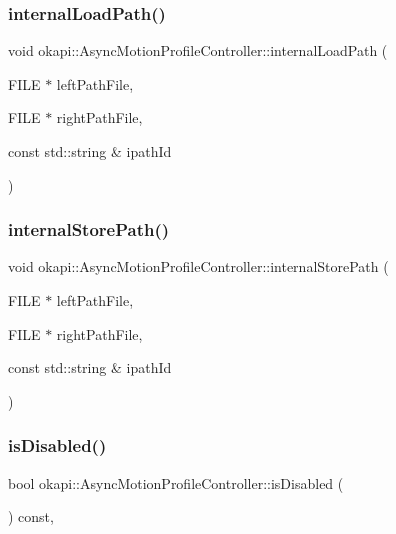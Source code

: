 \subsubsection{\texorpdfstring{internalLoadPath()}{internalLoadPath()}}
{\footnotesize\ttfamily void okapi\+::\+Async\+Motion\+Profile\+Controller\+::internal\+Load\+Path (\begin{DoxyParamCaption}\item[{F\+I\+LE $\ast$}]{left\+Path\+File,  }\item[{F\+I\+LE $\ast$}]{right\+Path\+File,  }\item[{const std\+::string \&}]{ipath\+Id }\end{DoxyParamCaption})\hspace{0.3cm}{\ttfamily [protected]}}

\mbox{\label{classokapi_1_1AsyncMotionProfileController_ae9f67978e53a0bab9c96ef774505bd58}} 
\subsubsection{\texorpdfstring{internalStorePath()}{internalStorePath()}}
{\footnotesize\ttfamily void okapi\+::\+Async\+Motion\+Profile\+Controller\+::internal\+Store\+Path (\begin{DoxyParamCaption}\item[{F\+I\+LE $\ast$}]{left\+Path\+File,  }\item[{F\+I\+LE $\ast$}]{right\+Path\+File,  }\item[{const std\+::string \&}]{ipath\+Id }\end{DoxyParamCaption})\hspace{0.3cm}{\ttfamily [protected]}}

\mbox{\label{classokapi_1_1AsyncMotionProfileController_a04bc0f7be2c116163bfbef0571dec2ef}} 
\subsubsection{\texorpdfstring{isDisabled()}{isDisabled()}}
{\footnotesize\ttfamily bool okapi\+::\+Async\+Motion\+Profile\+Controller\+::is\+Disabled (\begin{DoxyParamCaption}{ }\end{DoxyParamCaption}) const\hspace{0.3cm}{\ttfamily [override]}, {\ttfamily [virtual]}}

